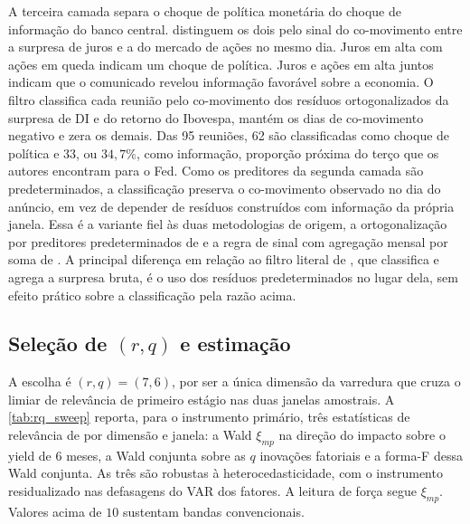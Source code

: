 \documentclass[preprint,authoryear,review,12pt]{elsarticle}
\begin{document}
A terceira camada separa o choque de política monetária do choque de informação do banco central. \cite{jarocinski2020} distinguem os dois pelo sinal do co-movimento entre a surpresa de juros e a do mercado de ações no mesmo dia. Juros em alta com ações em queda indicam um choque de política. Juros e ações em alta juntos indicam que o comunicado revelou informação favorável sobre a economia. O filtro classifica cada reunião pelo co-movimento dos resíduos ortogonalizados da surpresa de DI e do retorno do Ibovespa, mantém os dias de co-movimento negativo e zera os demais. Das 95 reuniões, 62 são classificadas como choque de política e 33, ou $34{,}7\%$, como informação, proporção próxima do terço que os autores encontram para o Fed. Como os preditores da segunda camada são predeterminados, a classificação preserva o co-movimento observado no dia do anúncio, em vez de depender de resíduos construídos com informação da própria janela. Essa é a variante fiel às duas metodologias de origem, a ortogonalização por preditores predeterminados de \cite{bauer2023} e a regra de sinal com agregação mensal por soma de \cite{jarocinski2020}. A principal diferença em relação ao filtro literal de \cite{jarocinski2020}, que classifica e agrega a surpresa bruta, é o uso dos resíduos predeterminados no lugar dela, sem efeito prático sobre a classificação pela razão acima. 

\subsection{Seleção de $(r, q)$ e estimação}

A escolha é $(r, q) = (7, 6)$, por ser a única dimensão da varredura que cruza o limiar de relevância de primeiro estágio nas duas janelas amostrais. A \autoref{tab:rq_sweep} reporta, para o instrumento primário, três estatísticas de relevância de \cite{montielolea} por dimensão e janela: a Wald $\xi_{mp}$ na direção do impacto sobre o yield de 6 meses, a Wald conjunta sobre as $q$ inovações fatoriais e a forma-F dessa Wald conjunta. As três são robustas à heterocedasticidade, com o instrumento residualizado nas defasagens do VAR dos fatores. A leitura de força segue $\xi_{mp}$. Valores acima de $10$ sustentam bandas convencionais. 
\end{document}
